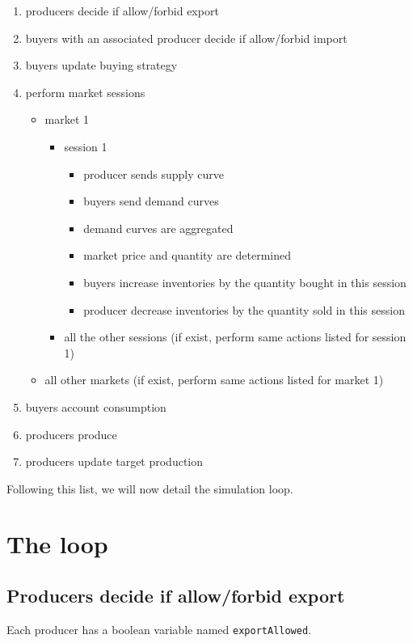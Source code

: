 \documentclass{article}
\begin{document}
\begin{enumerate}
	\item producers decide if allow/forbid export
	\item buyers with an associated producer decide if allow/forbid import
	\item buyers update buying strategy
	\item perform market sessions
		\begin{itemize}
			\item market 1
				\begin{itemize}
				\item session 1 
					\begin{itemize}
						\item producer sends supply curve
						\item buyers send demand curves
						\item demand curves are aggregated 
						\item market price and quantity are determined
						\item buyers increase inventories by the quantity bought in this session
						\item producer decrease inventories by the quantity sold in this session
					\end{itemize}
				\item all the other sessions (if exist, perform same actions listed for session 1)
				\end{itemize}
			\item  all other markets (if exist, perform same actions listed for market 1)
		\end{itemize}
	\item buyers account consumption
	\item producers produce
	\item producers update target production
\end{enumerate}

Following this list, we will now detail the simulation loop. 

\section{The loop}

\subsection{Producers decide if allow/forbid export}

Each producer has a boolean variable named \verb+exportAllowed+.    
\end{document}
